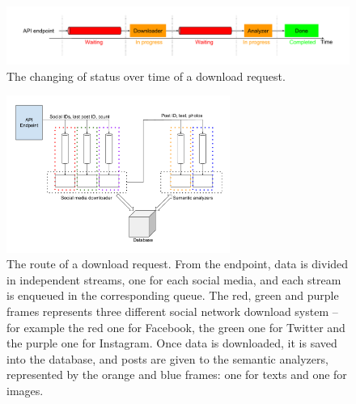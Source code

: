 \begin{figure}
\centering
\includegraphics[width=%
1\textwidth]{img/DownloadStatuses}
\caption{The changing of status over time of a download request.}
\label{fig:statuses}
\end{figure}

\begin{figure}
\centering
\includegraphics[width=%
0.65\textwidth]{img/Queues}
\caption{The route of a download request. From the endpoint, data is divided in independent streams, one for each social media, and each stream is enqueued in the corresponding queue. The red, green and purple frames represents three different social network download system -- for example the red one for Facebook, the green one for Twitter and the purple one for Instagram. Once data is downloaded, it is saved into the database, and posts are given to the semantic analyzers, represented by the orange and blue frames: one for texts and one for images.}
\label{fig:queues}
\end{figure}

